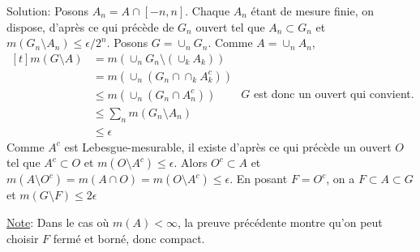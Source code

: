 \documentclass{report}
\begin{document}
Solution: Posons $A_n = A\cap [-n,n]$. Chaque $A_n$ étant de mesure finie, on dispose, d'après ce qui précède de $G_n$ ouvert tel que $A_n\subset G_n$ et $m(G_n\setminus A_n)\leq \epsilon/2^n$. Posons $G=\cup_n G_n$. Comme $A=\cup_n A_n$, $\begin{aligned}[t] m(G\setminus A) &= m(\cup_n G_n \setminus \left(\cup_k A_k \right)) \\ 
&= m(\cup_n \left( G_n \cap \cap_k A_k^c \right)) \\ &\leq m(\cup_n \left( G_n \cap A_n^c \right)) \\ &\leq \sum_n m(G_n \setminus A_n)\\ &\leq \epsilon \end{aligned}$ \newline
$G$ est donc un ouvert qui convient.
 \newline \newline
Comme $A^c$ est Lebesgue-mesurable, il existe d'après ce qui précède un ouvert $O$ tel que $A^c\subset O$ et $m(O\setminus A^c)\leq \epsilon $. Alors $O^c \subset A$ et $m(A\setminus O^c) = m(A\cap O)  = m(O \setminus A^c) \leq \epsilon $. \newline
En posant $F = O^c$, on a $F\subset A \subset G$ et $m(G\setminus F)\leq 2\epsilon$ \newline \newline

\underline{Note}: Dans le cas où $m(A)<\infty$, la preuve précédente montre qu'on peut choisir $F$ fermé et borné, donc compact.


\newpage
 \subsection{}  \\ \\
\end{document}
